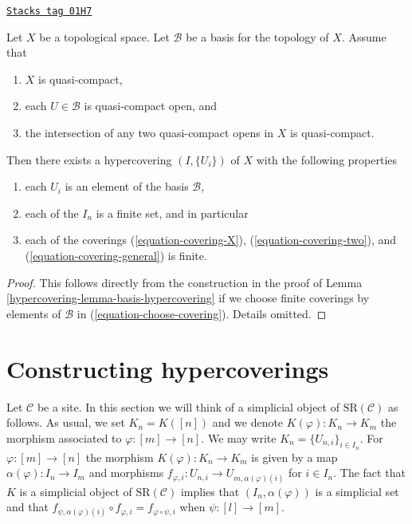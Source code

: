 \begin{lemma}
\label{hypercovering-lemma-quasi-separated-quasi-compact-hypercovering}
\href{https://stacks.math.columbia.edu/tag/01H7}{\texttt{Stacks tag 01H7}}

Let $X$ be a topological space.
Let $\mathcal{B}$ be a basis for the topology of $X$.
Assume that
\begin{enumerate}
\item $X$ is quasi-compact,
\item each $U \in \mathcal{B}$ is quasi-compact open, and
\item the intersection of any two quasi-compact opens in
$X$ is quasi-compact.
\end{enumerate}
Then there exists a hypercovering $(I, \{U_i\})$ of $X$ with the
following properties
\begin{enumerate}
\item each $U_i$ is an element of the basis $\mathcal{B}$,
\item each of the $I_n$ is a finite set, and in particular
\item each of the coverings  (\ref{equation-covering-X}),
(\ref{equation-covering-two}), and (\ref{equation-covering-general})
is finite.
\end{enumerate}
\end{lemma}

\begin{proof}

This follows directly from the construction in the proof of
Lemma \ref{hypercovering-lemma-basis-hypercovering} if we choose finite coverings
by elements of $\mathcal{B}$ in (\ref{equation-choose-covering}).
Details omitted.
\end{proof}

\section{Constructing hypercoverings}
\label{hypercovering-section-hypercovering-sites}
Let $\mathcal{C}$ be a site. In this section we will think of a
simplicial object of $\text{SR}(\mathcal{C})$ as follows.
As usual, we set $K_n = K([n])$ and we denote $K(\varphi) : K_n \to K_m$
the morphism associated to $\varphi : [m] \to [n]$.
We may write $K_n = \{U_{n, i}\}_{i \in I_n}$. For
$\varphi : [m] \to [n]$ the morphism $K(\varphi) : K_n \to K_m$
is given by a map $\alpha(\varphi) : I_n \to I_m$ and morphisms
$f_{\varphi, i} : U_{n, i} \to U_{m, \alpha(\varphi)(i)}$
for $i \in I_n$. The fact that $K$ is a simplicial object of
$\text{SR}(\mathcal{C})$ implies that $(I_n, \alpha(\varphi))$
is a simplicial set
and that $f_{\psi, \alpha(\varphi)(i)} \circ f_{\varphi, i} =
f_{\varphi \circ \psi, i}$ when $\psi : [l] \to [m]$.

